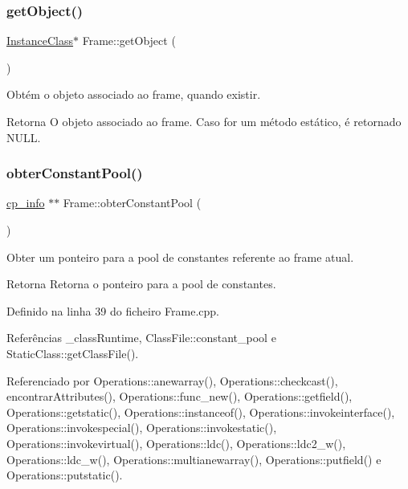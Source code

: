 \mbox{\label{classFrame_a4a45cafe1eee6c6b2ae6a04e284163f9}} 
\subsubsection{\texorpdfstring{get\+Object()}{getObject()}}
{\footnotesize\ttfamily \hyperlink{classInstanceClass}{Instance\+Class}$\ast$ Frame\+::get\+Object (\begin{DoxyParamCaption}{ }\end{DoxyParamCaption})}



Obtém o objeto associado ao frame, quando existir. 

\begin{DoxyReturn}{Retorna}
O objeto associado ao frame. Caso for um método estático, é retornado {\ttfamily N\+U\+LL}. 
\end{DoxyReturn}
\mbox{\label{classFrame_a77f9705e64bfbdfc68921b7de11a893f}} 
\subsubsection{\texorpdfstring{obter\+Constant\+Pool()}{obterConstantPool()}}
{\footnotesize\ttfamily \hyperlink{structcp__info}{cp\+\_\+info} $\ast$$\ast$ Frame\+::obter\+Constant\+Pool (\begin{DoxyParamCaption}{ }\end{DoxyParamCaption})}



Obter um ponteiro para a pool de constantes referente ao frame atual. 

\begin{DoxyReturn}{Retorna}
Retorna o ponteiro para a pool de constantes. 
\end{DoxyReturn}


Definido na linha 39 do ficheiro Frame.\+cpp.



Referências \+\_\+class\+Runtime, Class\+File\+::constant\+\_\+pool e Static\+Class\+::get\+Class\+File().



Referenciado por Operations\+::anewarray(), Operations\+::checkcast(), encontrar\+Attributes(), Operations\+::func\+\_\+new(), Operations\+::getfield(), Operations\+::getstatic(), Operations\+::instanceof(), Operations\+::invokeinterface(), Operations\+::invokespecial(), Operations\+::invokestatic(), Operations\+::invokevirtual(), Operations\+::ldc(), Operations\+::ldc2\+\_\+w(), Operations\+::ldc\+\_\+w(), Operations\+::multianewarray(), Operations\+::putfield() e Operations\+::putstatic().

